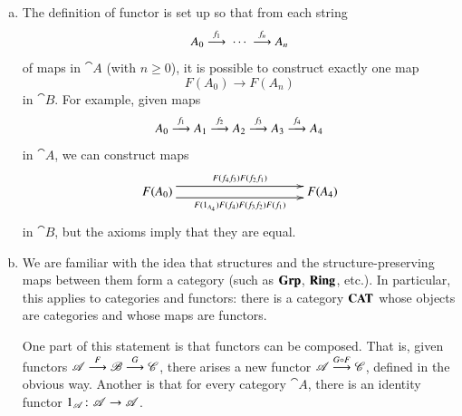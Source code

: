 \begin{remarks}
\label{rmks:defn-ftr}
\begin{enumerate}[(b)]
\item
\label{rmk:defn-ftr:loosely}
The definition of functor is set up so that from each string
\[
A_0 \toby{f_1} \ \cdots\ \toby{f_n} A_n
\]
of maps in $\cat{A}$ (with $n \geq 0$), it is possible to construct exactly
one%
%
%
map
\[
F(A_0) \to F(A_n)
\]
in $\cat{B}$.  For example, given maps
\[
A_0 \stackrel{f_1}{\longrightarrow} A_1 \stackrel{f_2}{\longrightarrow} A_2 \stackrel{f_3}{\longrightarrow} A_3 \stackrel{f_4}{\longrightarrow} A_4
\]
in $\cat{A}$, we can construct maps
\[
\xymatrix@=10em{
F(A_0)
\ar@<1ex>[r]^{F(f_4 f_3) F(f_2 f_1)}
\ar@<-1ex>[r]_{F(1_{A_4}) F(f_4) F(f_3 f_2) F(f_1)}     &
F(A_4)
}
\]
in $\cat{B}$, but the axioms imply that they are equal.

\item
\label{rmk:defn-ftr:comp}
We are familiar with the idea that structures and the structure-preserving
maps between them form a category (such as $\mathbf{Grp}$, $\mathbf{Ring}$, etc.).  In
particular, this applies to categories and functors: there is a category
$\mathbf{CAT}$%
%
%
%
whose objects are categories and whose maps are functors.

One part of this statement is that functors can be composed.%
%
%
That is, given functors $\mathscr{A} \stackrel{F}{\longrightarrow} \mathscr{B} \stackrel{G}{\longrightarrow} \mathscr{C}$, there
arises a new functor $\mathscr{A} \stackrel{G \mathbin{\circ} F}{\longrightarrow} \mathscr{C}$,%
%
%
defined in the obvious way.  Another is that for every category $\cat{A}$,
there is an identity%
%
%
functor $1_\cat{A}\from \cat{A} \to \cat{A}$.%
%
%
\end{enumerate}
\end{remarks}

